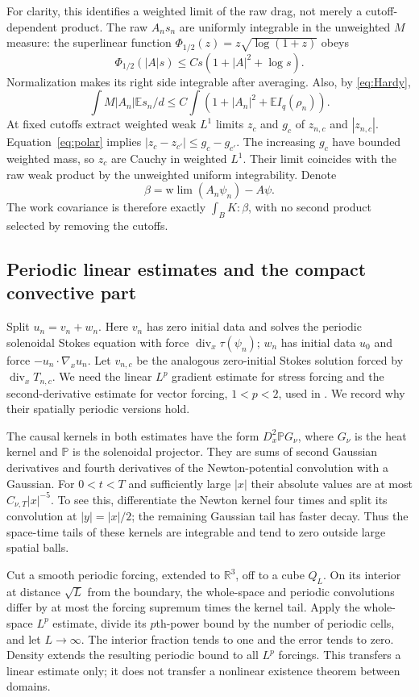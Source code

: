 \documentclass[11pt]{article}
\numberwithin{equation}{section}
\newcommand{\R}{\mathbb R}
\newcommand{\E}{\mathbb E}
\newcommand{\Div}{\operatorname{div}}
\newcommand{\grad}{\nabla}
\begin{document}
For clarity, this identifies a weighted limit of the raw drag, not merely a
cutoff-dependent product. The raw $A_ns_n$ are uniformly integrable in the
unweighted $M$ measure: the superlinear function
$\Phi_{1/2}(z)=z\sqrt{\log(1+z)}$ obeys
\[
 \Phi_{1/2}(|A|s)\leq Cs(1+|A|^2+\log s).
\]
Normalization makes its right side integrable after averaging. Also, by
\eqref{eq:Hardy},
\[
 \int M|A_n|\E s_n/d\leq C\int(1+|A_n|^2+\E I_q(\rho_n)).
\]
At fixed cutoffs extract weighted weak
$L^1$ limits $z_c$ and $g_c$ of $z_{n,c}$ and $|z_{n,c}|$.
Equation~\eqref{eq:polar} implies
$|z_c-z_{c'}|\leq g_c-g_{c'}$. The increasing $g_c$ have bounded weighted
mass, so $z_c$ are Cauchy in weighted $L^1$. Their limit coincides with the
raw weak product by the unweighted uniform integrability. Denote
\begin{equation}\label{eq:beta}
 \beta=\mathrm{w}\!\lim(A_n\psi_n)-A\psi.
\end{equation}
The work covariance is therefore exactly $\int_BK:\beta$, with no second
product selected by removing the cutoffs.

\subsection{Periodic linear estimates and the compact convective part}\label{subsec:periodicStokes}
Split $u_n=v_n+w_n$. Here $v_n$ has zero initial data and solves the periodic
solenoidal Stokes equation with force $\Div_x\tau(\psi_n)$; $w_n$ has initial
data $u_0$ and force $-u_n\cdot\grad_xu_n$. Let $v_{n,c}$ be the analogous
zero-initial Stokes solution forced by $\Div_x T_{n,c}$.
We need the linear $L^p$ gradient estimate for stress forcing and the
second-derivative estimate for vector forcing, $1<p<2$, used in
\cite[Section~5.4]{Masmoudi}. We record why their spatially periodic versions
hold.

The causal kernels in both estimates have the form $D_x^2\mathbb P G_\nu$,
where $G_\nu$ is the heat kernel and $\mathbb P$ is the solenoidal projector.
They are sums of second Gaussian derivatives and fourth derivatives of the
Newton-potential convolution with a Gaussian. For $0<t<T$ and sufficiently
large $|x|$ their absolute values are at most $C_{\nu,T}|x|^{-5}$.
To see this, differentiate the Newton kernel four times and split its
convolution at $|y|=|x|/2$; the remaining Gaussian tail has faster decay.
Thus the space-time tails of these kernels are integrable and tend to zero
outside large spatial balls.

Cut a smooth periodic forcing, extended to $\R^3$, off to a cube $Q_L$.
On its interior at distance $\sqrt L$ from the boundary, the whole-space and
periodic convolutions differ by at most the forcing supremum times the kernel
tail. Apply the whole-space $L^p$ estimate, divide its $p$th-power bound by the
number of periodic cells, and let $L\to\infty$. The interior fraction tends
to one and the error tends to zero. Density extends the resulting periodic
bound to all $L^p$ forcings. This transfers a linear estimate only; it does not
transfer a nonlinear existence theorem between domains.
\end{document}

